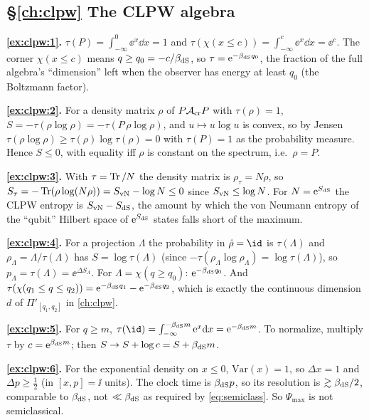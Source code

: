 {\subsection*{\S\ref{ch:clpw} The CLPW algebra}
\textbf{\ref{ex:clpw:1}.} $\tau(P)=\int_{-\infty}^0\ee^{x}\dd x=1$ and $\tau(\chi(x\le c))=\int_{-\infty}^c\ee^x\dd x=\ee^c$. The corner $\chi(x\le c)$ means $q\ge q_0=-c/\beta_{\rm dS}$, so $\tau=\mathrm{e}^{-\beta_{\rm dS}q_0}$, the fraction of the full algebra's ``dimension'' left when the observer has energy at least $q_0$ (the Boltzmann factor).\par
\textbf{\ref{ex:clpw:2}.} For a density matrix $\rho$ of $P\mathcal{A}_{\rm cr}P$ with $\tau(\rho)=1$, $S=-\tau(\rho\log\rho)=-\tau(P\,\rho\log\rho)$, and $u\mapsto u\log u$ is convex, so by Jensen $\tau(\rho\log\rho)\ge\tau(\rho)\log\tau(\rho)=0$ with $\tau(P)=1$ as the probability measure. Hence $S\le0$, with equality iff $\rho$ is constant on the spectrum, i.e.\ $\rho=P$.\par
\textbf{\ref{ex:clpw:3}.} With $\tau=\operatorname{Tr}/N$ the density matrix is $\rho_\tau=N\rho$, so $S_\tau=-\operatorname{Tr}(\rho\log(N\rho))=S_{\rm vN}-\log N\le0$ since $S_{\rm vN}\le\log N$. For $N=\mathrm{e}^{S_{\rm dS}}$ the CLPW entropy is $S_{\rm vN}-S_{\rm dS}$, the amount by which the von Neumann entropy of the ``qubit'' Hilbert space of $\mathrm{e}^{S_{\rm dS}}$ states falls short of the maximum.\par
\textbf{\ref{ex:clpw:4}.} For a projection $\Lambda$ the probability in $\hat\rho=\id$ is $\tau(\Lambda)$ and $\rho_\Lambda=\Lambda/\tau(\Lambda)$ has $S=\log\tau(\Lambda)$ (since $-\tau(\rho_\Lambda\log\rho_\Lambda)=\log\tau(\Lambda)$), so $p_\Lambda=\tau(\Lambda)=\ee^{\Delta S_\Lambda}$. For $\Lambda=\chi(q\ge q_0)$: $\mathrm{e}^{-\beta_{\rm dS}q_0}$. And $\tau(\chi(q_1\le q\le q_2))=\mathrm{e}^{-\beta_{\rm dS}q_1}-\mathrm{e}^{-\beta_{\rm dS}q_2}$, which is exactly the continuous dimension $d$ of $\Pi'_{[q_1,q_2]}$ in \cref{ch:clpw}.\par
\textbf{\ref{ex:clpw:5}.} For $q\ge m$, $\tau(\id)=\int_{-\infty}^{-\beta_{\rm dS}m}\ee^x\dd x=\ee^{-\beta_{\rm dS}m}$. To normalize, multiply $\tau$ by $c=\mathrm{e}^{\beta_{\rm dS}m}$; then $S\to S+\log c=S+\beta_{\rm dS}m$.\par
\textbf{\ref{ex:clpw:6}.} For the exponential density on $x\le0$, $\mathrm{Var}(x)=1$, so $\Delta x=1$ and $\Delta p\ge\frac12$ (in $[x,p]=\ii$ units). The clock time is $\beta_{\rm dS}p$, so its resolution is $\gtrsim\beta_{\rm dS}/2$, comparable to $\beta_{\rm dS}$, not $\ll\beta_{\rm dS}$ as required by \eqref{eq:semiclass}. So $\Psi_{\max}$ is not semiclassical.\par

}
